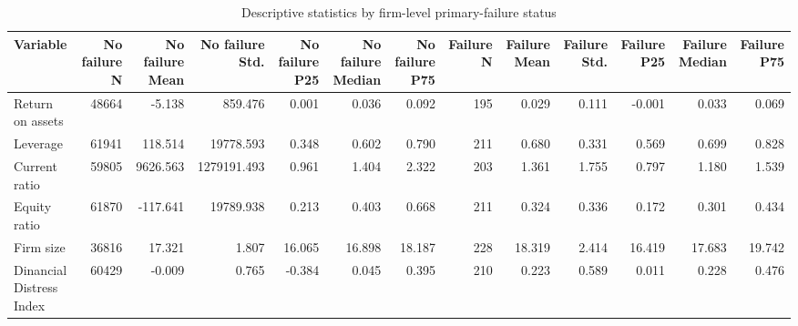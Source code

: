 \begin{table}
\caption{Descriptive statistics by firm-level primary-failure status}
\label{tab:descriptives}
\begin{tabular}{lrrrrrrrrrrrr}
\toprule
Variable & No failure N & No failure Mean & No failure Std. & No failure P25 & No failure Median & No failure P75 & Failure N & Failure Mean & Failure Std. & Failure P25 & Failure Median & Failure P75 \\
\midrule
Return on assets & 48664 & -5.138 & 859.476 & 0.001 & 0.036 & 0.092 & 195 & 0.029 & 0.111 & -0.001 & 0.033 & 0.069 \\
Leverage & 61941 & 118.514 & 19778.593 & 0.348 & 0.602 & 0.790 & 211 & 0.680 & 0.331 & 0.569 & 0.699 & 0.828 \\
Current ratio & 59805 & 9626.563 & 1279191.493 & 0.961 & 1.404 & 2.322 & 203 & 1.361 & 1.755 & 0.797 & 1.180 & 1.539 \\
Equity ratio & 61870 & -117.641 & 19789.938 & 0.213 & 0.403 & 0.668 & 211 & 0.324 & 0.336 & 0.172 & 0.301 & 0.434 \\
Firm size & 36816 & 17.321 & 1.807 & 16.065 & 16.898 & 18.187 & 228 & 18.319 & 2.414 & 16.419 & 17.683 & 19.742 \\
Dinancial Distress Index & 60429 & -0.009 & 0.765 & -0.384 & 0.045 & 0.395 & 210 & 0.223 & 0.589 & 0.011 & 0.228 & 0.476 \\
\bottomrule
\end{tabular}
\end{table}
